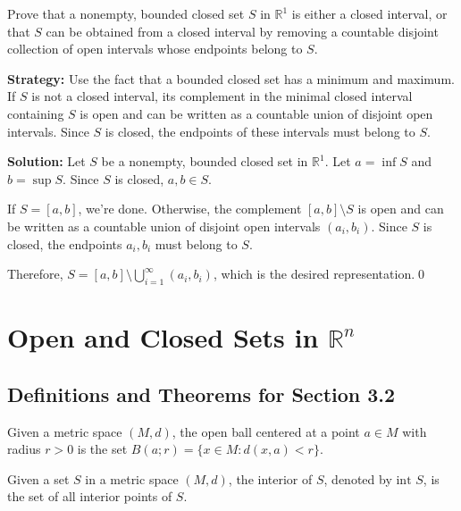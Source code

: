 \begin{problembox}
Prove that a nonempty, bounded closed set $S$ in $\mathbb{R}^1$ is either a closed interval, or that $S$ can be obtained from a closed interval by removing a countable disjoint collection of open intervals whose endpoints belong to $S$.
\end{problembox}

\noindent\textbf{Strategy:} Use the fact that a bounded closed set has a minimum and maximum. If $S$ is not a closed interval, its complement in the minimal closed interval containing $S$ is open and can be written as a countable union of disjoint open intervals. Since $S$ is closed, the endpoints of these intervals must belong to $S$.

\bigskip\noindent\textbf{Solution:} Let $S$ be a nonempty, bounded closed set in $\mathbb{R}^1$. Let $a = \inf S$ and $b = \sup S$. Since $S$ is closed, $a, b \in S$.

If $S = [a,b]$, we're done. Otherwise, the complement $[a,b] \setminus S$ is open and can be written as a countable union of disjoint open intervals $(a_i, b_i)$. Since $S$ is closed, the endpoints $a_i, b_i$ must belong to $S$.

Therefore, $S = [a,b] \setminus \bigcup_{i=1}^{\infty} (a_i, b_i)$, which is the desired representation.\qed
\section{Open and Closed Sets in $\mathbb{R}^n$}

\subsection*{Definitions and Theorems for Section 3.2}

\begin{definition}
Given a metric space $(M,d)$, the open ball centered at a point $a \in M$ with radius $r > 0$ is the set $B(a;r) = \{x \in M : d(x,a) < r\}$.
\end{definition}

\begin{definition}
Given a set $S$ in a metric space $(M,d)$, the interior of $S$, denoted by $\text{int } S$, is the set of all interior points of $S$.
\end{definition}

